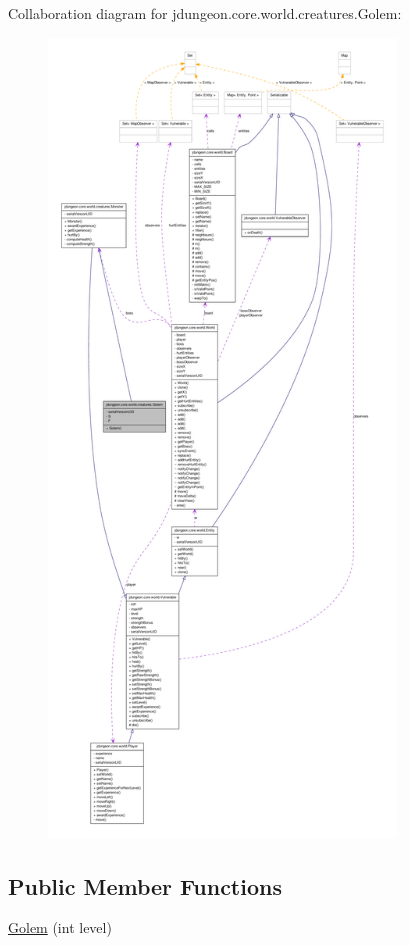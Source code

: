 Collaboration diagram for jdungeon.core.world.creatures.Golem:
\nopagebreak
\begin{figure}[H]
\begin{center}
\leavevmode
\includegraphics[height=600pt]{classjdungeon_1_1core_1_1world_1_1creatures_1_1_golem__coll__graph}
\end{center}
\end{figure}
\subsection*{Public Member Functions}
\begin{DoxyCompactItemize}
\item 
\hyperlink{classjdungeon_1_1core_1_1world_1_1creatures_1_1_golem_a0c55d1e145f5f71bb2f751b98aae8f53}{Golem} (int level)
\end{DoxyCompactItemize}


